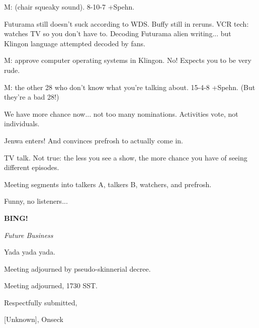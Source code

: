 \documentclass[12pt]{article}
\newcommand{\bing}{{\bf BING!} }
\newcommand{\goto}[1]{\bing \vskip 12pt \centerline{{\em{#1}}}}
\begin{document}
M: (chair squeaky sound). 8-10-7 +Spehn.

Futurama still doesn't suck according to WDS. Buffy still in reruns. VCR tech: watches TV so you don't have to.
Decoding Futurama alien writing... but Klingon language attempted decoded by fans.

M: approve computer operating systems in Klingon. No! Expects you to be very rude.

M: the other 28 who don't know what you're talking about. 15-4-8 +Spehn. (But they're a bad 28!)

We have more chance now... not too many nominations. Activities vote, not individuals.

Jenwa enters! And convinces prefrosh to actually come in.

TV talk. Not true: the less you see a show, the more chance you have of seeing different episodes.

Meeting segments into talkers A, talkers B, watchers, and prefrosh.

Funny, no listeners...

\goto{Future Business}

Yada yada yada.

Meeting adjourned by pseudo-skinnerial decree.

\vspace{12pt}

\noindent
Meeting adjourned, 1730 SST.

\vspace{18pt}

\centerline{Respectfully submitted,}
\centerline{[Unknown], Onseck}
\end{document}
